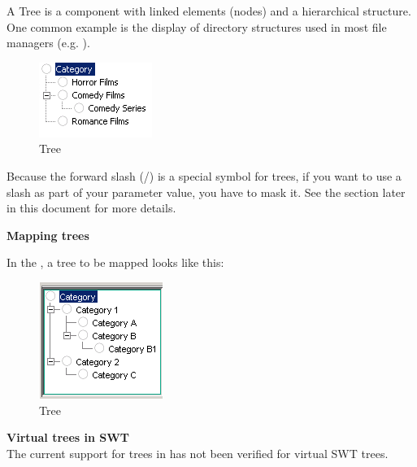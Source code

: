 A Tree is a component with linked
elements (nodes) and a hierarchical structure. One common example is
the display of directory structures used in most file managers
(e.g. ).

\begin{figure}
\begin{center}
\includegraphics{PS/Tree}
\caption{Tree}
\label{tree}
\end{center}
\end{figure}


Because the forward slash (/) is a special symbol for trees, if you want to use a slash as part of your parameter value, you have to mask it. See the section later in this document  for more details. 

\textbf{Mapping trees}

In the \gdomm{}, a tree to be mapped looks like this:

\begin{figure}
\begin{center}
\includegraphics{PS/Maptree}
\caption{Tree}
\label{maptree}
\end{center}
\end{figure}


\textbf{Virtual trees in SWT}\\
The current support for trees in \app{} has not been verified for virtual SWT trees. 
